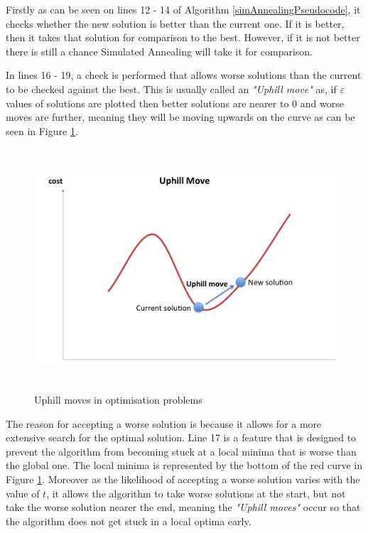 \documentclass[12pt]{report}
\begin{document}
Firstly as can be seen on lines 12 - 14 of Algorithm \ref{simAnnealingPseudocode}, it checks whether the new solution is better than the current one. If it is better, then it takes that solution for comparison to the best. However, if it is not better there is still a chance Simulated Annealing will take it for comparison. 

In lines 16 - 19, a check is performed that allows worse solutions than the current to be checked against the best. This is usually called an \textit{"Uphill move"} as, if $\varepsilon$ values of solutions are plotted then better solutions are nearer to 0 and worse moves are further, meaning they will be moving upwards on the curve as can be seen in Figure \ref{uphillMove}.

\begin{figure}[H]
\centering
\includegraphics[width=16cm, height=9cm]{./uphillmove}
\caption{Uphill moves in optimisation problems}
\label{uphillMove}
\end{figure}

The reason for accepting a worse solution is because it allows for a more extensive search for the optimal solution. Line 17 is a feature that is designed to prevent the algorithm from becoming stuck at a local minima that is worse than the global one\cite{simAnnealing}. The local minima is represented by the bottom of the red curve in Figure \ref{uphillMove}. Moreover as the likelihood of accepting a worse solution varies with the value of $t$, it allows the algorithm to take worse solutions at the start, but not take the worse solution nearer the end, meaning the \textit{"Uphill moves"} occur so that the algorithm does not get stuck in a local optima early.
\end{document}
